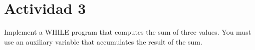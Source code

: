 \documentclass[fleqn, 10pt]{article}
\begin{document}
\section*{Actividad 3}
Implement a WHILE program that computes the sum of three values. You
must use an auxiliary variable that accumulates the result of the sum.

\subsection*{}
\end{document}
